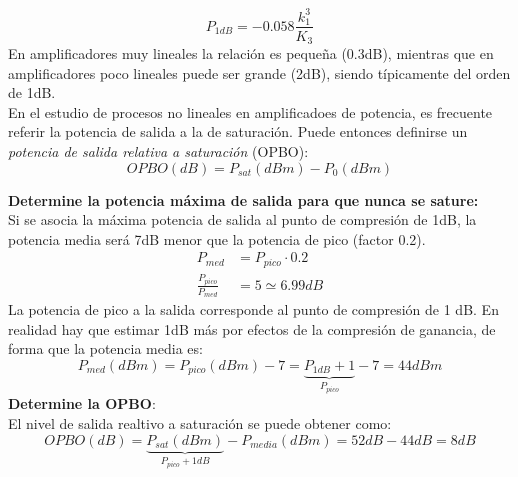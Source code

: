 \documentclass[
	12pt, %
	fleqn, %
	a4paper, %
	oneside, %
]{LegrandOrangeBook}
\begin{document}
\begin{displaymath}
P_{1dB}=-0.058\frac{k_1^3}{K_3}
\end{displaymath}
En amplificadores muy lineales la relación es pequeña (0.3dB), mientras que en amplificadores poco lineales puede ser grande (2dB), siendo típicamente del orden de 1dB.\\
En el estudio de procesos no lineales en amplificadoes de potencia, es frecuente referir la potencia de salida a la de saturación. Puede entonces definirse un \textit{potencia de salida relativa a saturación} (OPBO):
\begin{equation}
OPBO (dB)=P_{sat}(dBm)- P_0(dBm)
\label{eq:opbo}
\end{equation}
\begin{example}
\textbf{Determine la potencia máxima de salida para que nunca se sature:}\\
Si se asocia la máxima potencia de salida al punto de compresión de 1dB, la potencia media será 7dB menor que la potencia de pico (factor 0.2).
\begin{align*}
P_{med}&=P_{pico}\cdot 0.2\\
\frac{P_{pico}}{P_{med}}&=5\simeq 6.99 dB
\end{align*}
La potencia de pico a la salida corresponde al punto de compresión de 1 dB. En realidad hay que estimar 1dB más por efectos de la compresión de ganancia, de forma que la potencia media es:
\begin{displaymath}
P_{med}(dBm)=P_{pico}(dBm)-7=\underbrace{P_{1dB}+1}_{P_{pico}}-7=44dBm
\end{displaymath}
\textbf{Determine la OPBO}:\\
El nivel de salida realtivo a saturación se puede obtener como:
\begin{displaymath}
OPBO(dB)=\underbrace{P_{sat}(dBm)}_{P_{pico}+1dB}- P_{media}(dBm)=52dB-44dB=8dB
\end{displaymath}
\end{example}
\end{document}
